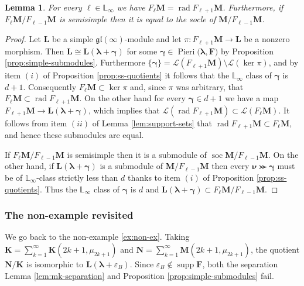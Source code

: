 \documentclass[11pt,fleqn]{amsart}
\newcommand\LL{\mathbb L}
\renewcommand\ll{{\boldsymbol \ell}}
\renewcommand\to{\longrightarrow}
\renewcommand\epsilon{\varepsilon}
\newtheorem{lem}[thm]{Lemma}
\theoremstyle{definition}
\theoremstyle{remark}
\theoremstyle{remark}
\newcommand\gl{\mathfrak{gl}}
\newcommand\wt[1]{\boldsymbol{#1}}
\DeclareMathOperator\soc{soc}
\DeclareMathOperator\rad{rad}
\DeclareMathOperator\supp{supp}
\newcommand\Pieri[2]{\operatorname{Pieri}{(#1},{#2)}}
\begin{document}
\begin{lem}
\label{lem:rad-soc}
For every $\ll \in \LL_{\infty}$ we have $F_\ll \mathbf M = \rad F_{\ll+1} \mathbf M$.
Furthermore, if $F_{\ll} \mathbf M/F_{\ll-1}\mathbf M$ is semisimple then it is 
equal to the socle of $\mathbf M / F_{\ll-1}\mathbf M$.
\end{lem}
\begin{proof}
Let $\mathbf L$ be a simple $\gl(\infty)$-module and let $\pi:F_{\ll+1} \mathbf M 
\to \mathbf L$ be a nonzero morphism. Then $\mathbf L \cong \mathbf 
L(\wt\lambda + \wt\gamma)$ for some $\wt\gamma \in \Pieri{\wt\lambda}{\mathbf 
F}$ by Proposition \ref{prop:simple-submodules}. Furthermore $\{\wt\gamma\} = 
\mathcal L(F_{\ll+1} \mathbf M) \setminus \mathcal L(\ker \pi)$, and by item 
$(i)$ of Proposition \ref{prop:ss-quotients} it follows that the $\LL_\infty$ 
class of $\wt\gamma$ is $d+1$. Consequently $F_{\ll} \mathbf M \subset \ker 
\pi$ and, since $\pi$ was arbitrary, that $F_\ll \mathbf M \subset \rad 
F_{\ll+1}\mathbf M$. On the other hand for every $\wt\gamma \in d+1$ we have a 
map $F_{\ll+1} \mathbf M \to \mathbf L(\wt\lambda + \wt\gamma)$, which implies 
that $\mathcal L(\rad F_{\ll+1} \mathbf M) \subset \mathcal L(F_{\ll}\mathbf 
M)$. It follows from item $(ii)$ of Lemma \ref{lem:support-sets} that $\rad 
F_{\ll+1} \mathbf M \subset F_\ll \mathbf M$, and hence these submodules are 
equal.

If $F_{\ll}\mathbf M/F_{\ll-1}\mathbf M$ is semisimple then it is a submodule 
of $\soc \mathbf M / F_{\ll-1}\mathbf M$. On the other hand, if $\mathbf 
L(\wt\lambda + \wt\gamma)$ is a submodule of $\mathbf M / F_{\ll-1}\mathbf M$ 
then every $\wt\nu \ggcurly \wt\gamma$ must be of $\LL_\infty$-class strictly 
less than $d$ thanks to item $(i)$ of Proposition \ref{prop:ss-quotients}. Thus 
the $\LL_\infty$ class of $\wt\gamma$ is $d$ and $\mathbf L(\wt\lambda + 
\wt\gamma) \subset F_{\ll}\mathbf M/F_{\ll-1}\mathbf M$.
\end{proof}

\subsubsection{The non-example revisited}
\label{ex:non-example-bis}
We go back to the non-example \ref{ex:non-ex}.
Taking $\mathbf K = \sum_{k = 1}^\infty \mathbf K(2k+1, \mu_{2k + 1})$ and 
$\mathbf N = \sum_{k = 1}^\infty \mathbf M(2k+1, \mu_{2k + 1})$, the quotient 
$\mathbf N/\mathbf K$ is isomorphic to $\mathbf L(\wt\lambda + \epsilon_B)$. 
Since $\epsilon_B \notin \supp \mathbf F$, both the separation 
Lemma \ref{lem:mk-separation} and Proposition \ref{prop:simple-submodules}
fail.
\end{document}
